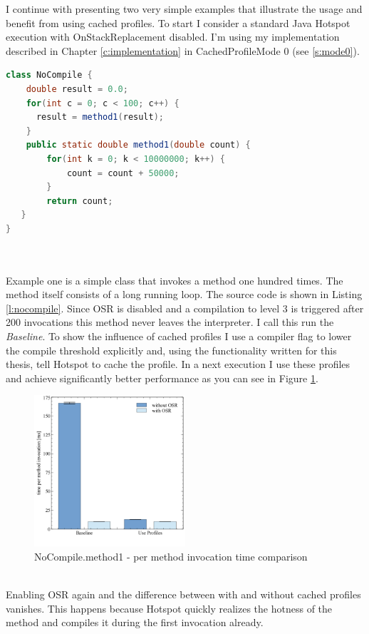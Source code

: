 I continue with presenting two very simple examples that illustrate the usage and benefit from using cached profiles. To start I consider a standard Java Hotspot execution with OnStackReplacement disabled. I'm using my implementation described in Chapter \ref{c:implementation} in CachedProfileMode 0 (see \ref{s:mode0}).
\lstset{numbers=left, numberstyle=\tiny, stepnumber=1, numbersep=5pt}
\lstset{basicstyle=\ttfamily}
\lstset{frame=tb}
\begin{lstlisting}[float,caption=Example usage of the listing package,label=l:nocompile,language=Java]
class NoCompile {
    double result = 0.0;
    for(int c = 0; c < 100; c++) {
      result = method1(result);
    }
    public static double method1(double count) {
        for(int k = 0; k < 10000000; k++) {
            count = count + 50000;
        }
        return count;
   }
}
\end{lstlisting}
\\\\
Example one is a simple class that invokes a method one hundred times. The method itself consists of a long running loop. The source code is shown in Listing \ref{l:nocompile}.
Since OSR is disabled and a compilation to level 3 is triggered after 200 invocations this method never leaves the interpreter. I call this run the \textit{Baseline}.
To show the influence of cached profiles I use a compiler flag to lower the compile threshold explicitly and, using the functionality written for this thesis, tell Hotspot to cache the profile.
In a next execution I use these profiles and achieve significantly better performance as you can see in Figure \ref{f:nocompile}.
\begin{figure}[h]
  \begin{center}
    \centering
    \includegraphics[width=0.5\textwidth]{figures/nocompile.png}
    \caption{NoCompile.method1 - per method invocation time comparison}
    \label{f:nocompile}
  \end{center}
\end{figure}
\\
Enabling OSR again and the difference between with and without cached profiles vanishes.
This happens because Hotspot quickly realizes the hotness of the method and compiles it during the first invocation already. 

